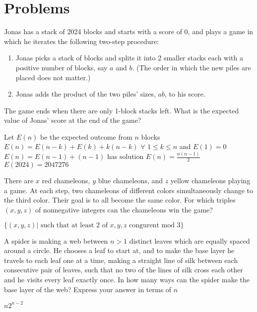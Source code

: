 \documentclass[12pt]{exam}
\begin{document}
\section{Problems}
\begin{questions}
\question Jonas has a stack of 2024 blocks and starts with a score of 0, and plays a game in which he iterates the following two-step procedure:
\begin{enumerate}
\item Jonas picks a stack of blocks and splits it into 2 smaller stacks each with a positive number of blocks, say $a$ and $b$. (The order in which the new piles are placed does not matter.)

\item Jonas adds the product of the two piles' sizes, $a b$, to his score.
\end{enumerate}
The game ends when there are only 1-block stacks left. What is the expected value of Jonas' score at the end of the game?
\begin{solution} Let $E(n)$ be the expected outcome from $n$ blocks \\
$E(n)=E(n-k)+E(k)+k(n-k)$ $\forall$ $1 \leq k \leq n$ and $E(1)=0$ \\
$E(n)=E(n-1)+(n-1)$ has solution $E(n)=\frac{n(n-1)}{2}$ \\
$E(2024)=2047276$
\end{solution}

\question 
There are $x$ red chameleons, $y$ blue chameleons, and $z$ yellow chameleons playing a game. At each step, two chameleons of different colors simultaneously change to the third color. Their goal is to all become the same color. For which triples $(x, y, z)$ of nonnegative integers can the chameleons win the game?
\begin{solution}
$\{(x,y,z)| \text{ such that at least 2 of } x,y,z \text{ congurent mod 3}\}$
\end{solution}

\question A spider is making a web between $n > 1$ distinct leaves which are equally spaced around a circle.
He chooses a leaf to start at, and to make the base layer he travels to each leaf one at a time, making
a straight line of silk between each consecutive pair of leaves, such that no two of the lines of silk cross
each other and he visits every leaf exactly once. In how many ways can the spider make the base layer
of the web? Express your answer in terms of $n$

\begin{solution}
$n2^{n-2}$
\end{solution}


\end{questions}
\end{document}
